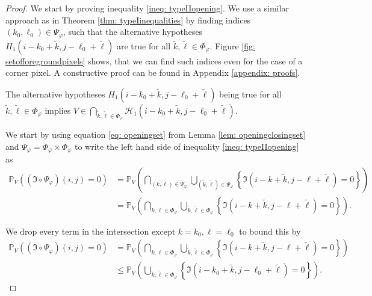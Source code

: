 \documentclass[a4paper,12pt]{article}
\theoremstyle{plain}
\theoremstyle{definition}
\numberwithin{equation}{section}
\begin{document}
\begin{proof}
	We start by proving inequality \eqref{ineq: typeIIopening}. We use a similar approach as in Theorem \ref{thm: typeIinequalities} by finding indices $(k_0, \ell_0) \in \Psi_\varphi$, such that the alternative hypotheses $H_1(i - k_0 + \tilde{k}, j - \ell_0 + \tilde{\ell})$ are true for all $\tilde{k}, \tilde{\ell} \in \Phi_\varphi$. Figure \ref{fig: setofforegroundpixels} shows, that we can find such indices even for the case of a corner pixel. A constructive proof can be found in Appendix \ref{appendix: proofs}.
	
	
	
	The alternative hypotheses $H_1(i - k_0 + \tilde{k}, j - \ell_0 + \tilde{\ell})$ being true for all $\tilde{k}, \tilde{\ell} \in \Phi_\varphi$ implies $V \in \bigcap_{\tilde{k}, \tilde{\ell} \in \Phi_\varphi} \mathcal{H}_1(i - k_0 + \tilde{k}, j - \ell_0 + \tilde{\ell})$.
	
	We start by using equation \eqref{eq: openingset} from Lemma \ref{lem: openingclosingset} and $\Psi_\varphi = \Phi_\varphi \times \Phi_\varphi$ to write the left hand side of inequality \eqref{ineq: typeIIopening} as
	\begin{align*}
		\mathbb{P}_V\left( (\mathfrak{I} \circ \Psi_\varphi)(i, j) = 0 \right) &= \mathbb{P}_V\left( \bigcap_{(k, \ell) \in \Psi_\varphi} \bigcup_{(\tilde{k}, \tilde{\ell}) \in \Psi_\varphi} \left\{ \mathfrak{I}(i - k + \tilde{k}, j - \ell + \tilde{\ell}) = 0 \right\} \right) \\
		&= \mathbb{P}_V\left( \bigcap_{k, \ell \in \Phi_\varphi} \bigcup_{\tilde{k}, \tilde{\ell} \in \Phi_\varphi} \left\{ \mathfrak{I}(i - k + \tilde{k}, j - \ell + \tilde{\ell}) = 0 \right\} \right).
	\end{align*}
	
	We drop every term in the intersection except $k = k_0, \ell = \ell_0$ to bound this by
	\begin{align*}
		\mathbb{P}_V\left( (\mathfrak{I} \circ \Psi_\varphi)(i, j) = 0 \right) &= \mathbb{P}_V\left( \bigcap_{k, \ell \in \Phi_\varphi} \bigcup_{\tilde{k}, \tilde{\ell} \in \Phi_\varphi} \left\{ \mathfrak{I}(i - k + \tilde{k}, j - \ell + \tilde{\ell}) = 0 \right\} \right) \\
		&\leq \mathbb{P}_V\left( \bigcup_{\tilde{k}, \tilde{\ell} \in \Phi_\varphi} \left\{ \mathfrak{I}(i - k_0 + \tilde{k}, j - \ell_0 + \tilde{\ell}) = 0 \right\} \right).
	\end{align*}
	

\end{proof}
\end{document}
